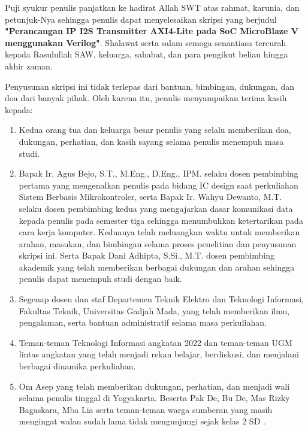 Puji syukur penulis panjatkan ke hadirat Allah SWT atas rahmat, karunia, dan
petunjuk-Nya sehingga penulis dapat menyelesaikan skripsi yang berjudul
\textbf{"Perancangan IP I2S Transmitter AXI4-Lite pada SoC MicroBlaze V menggunakan Verilog"}.
Shalawat serta salam semoga senantiasa tercurah kepada Rasulullah SAW,
keluarga, sahabat, dan para pengikut beliau hingga akhir zaman.

Penyusunan skripsi ini tidak terlepas dari bantuan, bimbingan, dukungan, dan
doa dari banyak pihak. Oleh karena itu, penulis menyampaikan terima kasih kepada:

\begin{enumerate}
	\item Kedua orang tua dan keluarga besar penulis yang selalu memberikan doa,
	dukungan, perhatian, dan kasih sayang selama penulis menempuh masa studi.
	
	\item Bapak Ir. Agus Bejo, S.T., M.Eng., D.Eng., IPM. selaku dosen
	pembimbing pertama yang mengenalkan penulis pada bidang IC design saat
	perkuliahan Sistem Berbasis Mikrokontroler, serta Bapak Ir. Wahyu Dewanto,
	M.T. selaku dosen pembimbing kedua yang mengajarkan dasar komunikasi data
	kepada penulis pada semester tiga sehingga menumbuhkan ketertarikan pada
	cara kerja komputer. Keduanya telah meluangkan waktu untuk memberikan
	arahan, masukan, dan bimbingan selama proses penelitian dan penyusunan
	skripsi ini. Serta Bapak Dani Adhipta, S.Si., M.T. dosen pembimbing akademik yang telah memberikan berbagai dukungan dan arahan sehingga penulis dapat menempuh studi dengan baik.

	\item Segenap dosen dan staf Departemen Teknik Elektro dan Teknologi Informasi,
	Fakultas Teknik, Universitas Gadjah Mada, yang telah memberikan ilmu,
	pengalaman, serta bantuan administratif selama masa perkuliahan.
	
	\item Teman-teman Teknologi Informasi angkatan 2022 dan teman-teman UGM lintas
	angkatan yang telah menjadi rekan belajar, berdiskusi, dan menjalani berbagai
	dinamika perkuliahan.
	
	\item Om Asep yang telah memberikan dukungan, perhatian, dan menjadi wali
	selama penulis tinggal di Yogyakarta. Beserta Pak De, Bu De, Mas Rizky Bagaskara, Mba Lia serta teman-teman warga sumberan yang masih mengingat walau sudah lama tidak mengunjungi sejak kelas 2 SD .
	

\end{enumerate}
